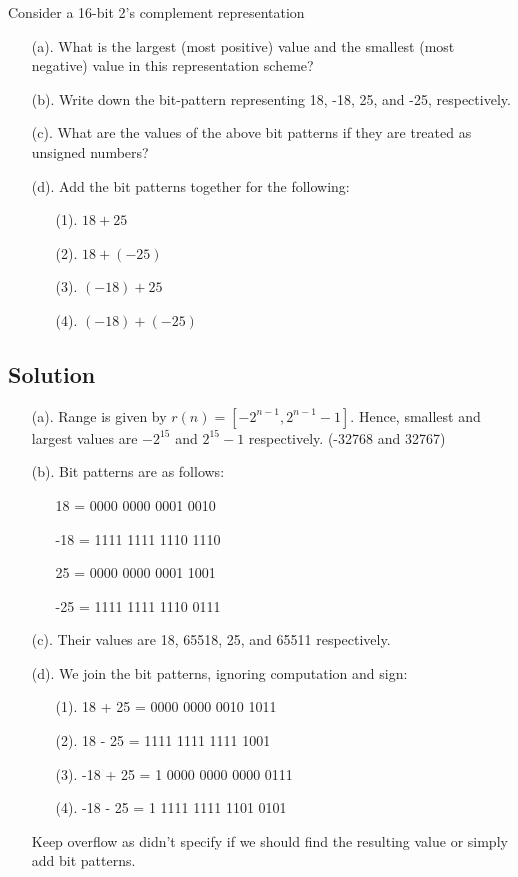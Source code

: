 \documentclass{article}
\begin{document}
Consider a 16-bit 2’s complement representation

\begin{enumerate}
    \item[(a).] What is the largest (most positive) value and the smallest (most negative) value in this representation scheme?
    \item[(b).] Write down the bit-pattern representing 18, -18, 25, and -25, respectively.
    \item[(c).] What are the values of the above bit patterns if they are treated as unsigned numbers?
    \item[(d).] Add the bit patterns together for the following:
          \begin{enumerate}
              \item[(1).] $18 + 25$
              \item[(2).] $18 + (-25)$
              \item[(3).] $(-18) + 25$
              \item[(4).] $(-18) + (-25)$
          \end{enumerate}
\end{enumerate}

\subsection*{Solution}


\begin{enumerate}
    \item[(a).] Range is given by $r(n) = [-2^{n-1}, 2^{n-1}-1]$. Hence, smallest and largest values are $-2^{15}$ and $2^{15}-1$ respectively. (-32768 and 32767)
    \item[(b).] Bit patterns are as follows:
          \begin{enumerate}
              \item[] 18 = 0000 0000 0001 0010
              \item[] -18 = 1111 1111 1110 1110
              \item[] 25 = 0000 0000 0001 1001
              \item[] -25 = 1111 1111 1110 0111
          \end{enumerate}
    \item[(c).] Their values are 18, 65518, 25, and 65511 respectively.
    \item[(d).] We join the bit patterns, ignoring computation and sign:
          \begin{enumerate}
              \item[(1).] 18 + 25 = 0000 0000 0010 1011
              \item[(2).] 18 - 25 = 1111 1111 1111 1001
              \item[(3).] -18 + 25 = 1 0000 0000 0000 0111
              \item[(4).] -18 - 25 = 1 1111 1111 1101 0101
          \end{enumerate}
          Keep overflow as didn't specify if we should find the resulting value or simply add bit patterns.
\end{enumerate}
\end{document}
